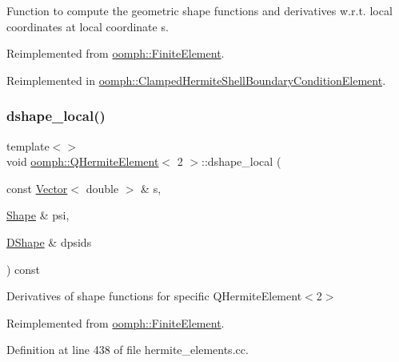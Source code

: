 Function to compute the geometric shape functions and derivatives w.\+r.\+t. local coordinates at local coordinate s. 



Reimplemented from \hyperlink{classoomph_1_1FiniteElement_a9db1456b827131c21a991ac9fedf4b0c}{oomph\+::\+Finite\+Element}.



Reimplemented in \hyperlink{classoomph_1_1ClampedHermiteShellBoundaryConditionElement_aa7324ef347e70cfa0828fa7c82074398}{oomph\+::\+Clamped\+Hermite\+Shell\+Boundary\+Condition\+Element}.

\mbox{\label{classoomph_1_1QHermiteElement_a0e7afb0634304e077928276302888d28}} 
\subsubsection{\texorpdfstring{dshape\+\_\+local()}{dshape\_local()}\hspace{0.1cm}{\footnotesize\ttfamily [3/3]}}
{\footnotesize\ttfamily template$<$$>$ \\
void \hyperlink{classoomph_1_1QHermiteElement}{oomph\+::\+Q\+Hermite\+Element}$<$ 2 $>$\+::dshape\+\_\+local (\begin{DoxyParamCaption}\item[{const \hyperlink{classoomph_1_1Vector}{Vector}$<$ double $>$ \&}]{s,  }\item[{\hyperlink{classoomph_1_1Shape}{Shape} \&}]{psi,  }\item[{\hyperlink{classoomph_1_1DShape}{D\+Shape} \&}]{dpsids }\end{DoxyParamCaption}) const\hspace{0.3cm}{\ttfamily [virtual]}}



Derivatives of shape functions for specific Q\+Hermite\+Element$<$2$>$ 



Reimplemented from \hyperlink{classoomph_1_1FiniteElement_a9db1456b827131c21a991ac9fedf4b0c}{oomph\+::\+Finite\+Element}.



Definition at line 438 of file hermite\+\_\+elements.\+cc.

\mbox{\label{classoomph_1_1QHermiteElement_a2b275f67da74572fb761d067bfaa71d1}} 
